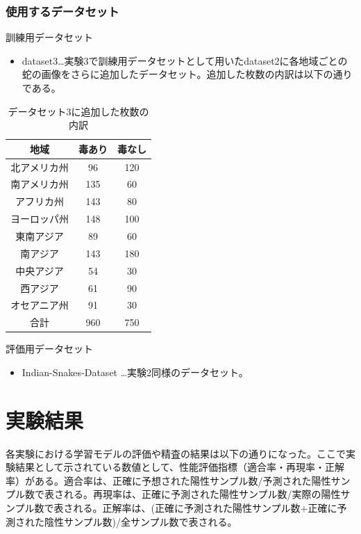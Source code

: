 \documentclass[a4paper, 11pt, titlepage]{jsarticle}
\begin{document}
\subsubsection{使用するデータセット}
訓練用データセット
\begin{itemize}
\item dataset3…実験3で訓練用データセットとして用いたdataset2に各地域ごとの蛇の画像をさらに追加したデータセット。追加した枚数の内訳は以下の通りである。

\end{itemize}\par
\begin{table}[htb]
\centering
  \caption{データセット3に追加した枚数の内訳}
  \begin{tabular}{|c|c|c|}  \hline
    地域 & 毒あり & 毒なし \\ \hline \hline
    北アメリカ州 & 96 & 120 \\ \hline
    南アメリカ州 & 135 & 60 \\ \hline
    アフリカ州 & 143 & 80 \\ \hline
    ヨーロッパ州 & 148 & 100 \\ \hline
    東南アジア & 89 & 60 \\ \hline
    南アジア & 143 & 180 \\ \hline
    中央アジア & 54 & 30 \\ \hline
    西アジア & 61 & 90 \\ \hline
    オセアニア州 & 91 & 30 \\ \hline \hline
    合計 & 960 & 750 \\ \hline
  \end{tabular}
\end{table}

評価用データセット
\begin{itemize}
\item Indian-Snakes-Dataset …実験2同様のデータセット。
\end{itemize}

\section{実験結果}
各実験における学習モデルの評価や精査の結果は以下の通りになった。ここで実験結果として示されている数値として、性能評価指標（適合率・再現率・正解率）がある。適合率は、正確に予想された陽性サンプル数/予測された陽性サンプル数で表される。再現率は、正確に予測された陽性サンプル数/実際の陽性サンプル数で表される。正解率は、(正確に予測された陽性サンプル数+正確に予測された陰性サンプル数)/全サンプル数で表される。
\end{document}
